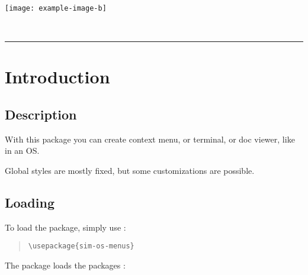 \documentclass[11pt,a4paper]{ltxdoc}
\begin{document}
\begin{tcolorbox}[colframe=lightgray,colback=lightgray!5]
\begin{IMGViewer}[Width=12cm]{}
\texttt{[image: example-image-b]}
\end{IMGViewer}
\end{tcolorbox}

\begin{tcolorbox}[colframe=lightgray,colback=lightgray!5]
\end{tcolorbox}

\vfill~

\pagebreak


\hypertarget{matoc}{}

\tableofcontents

\vspace*{5mm}

\hrule

\vspace*{5mm}

\section{Introduction}

\subsection{Description}

With this package you can create context menu, or terminal, or doc viewer, like in an OS.

Global styles are mostly fixed, but some customizations are possible.

\subsection{Loading}

To load the package, simply use :

\begin{quote}
\begin{verbatim}
\usepackage{sim-os-menus}
\end{verbatim}
\end{quote}

The package loads the packages :
\end{document}
